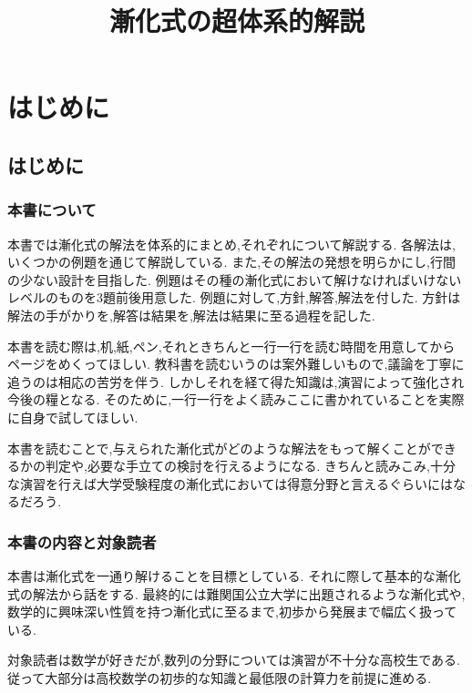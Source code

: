 \documentclass[dvipdfmx,a4paper,11pt,fleqn,openany]{jsbook}
\title{漸化式の超体系的解説}
\begin{document}
\date{}
\author{}
\maketitle

\tableofcontents

\chapter{はじめに}
  \section{はじめに}
    \subsection{本書について}
      本書では漸化式の解法を体系的にまとめ,それぞれについて解説する.
      各解法は,いくつかの例題を通じて解説している.
      また,その解法の発想を明らかにし,行間の少ない設計を目指した.
      例題はその種の漸化式において解けなければいけないレベルのものを3題前後用意した.
      例題に対して,方針,解答,解法を付した.
      方針は解法の手がかりを,解答は結果を,解法は結果に至る過程を記した.

      本書を読む際は,机,紙,ペン,それときちんと一行一行を読む時間を用意してからページをめくってほしい.
      教科書を読むいうのは案外難しいもので,議論を丁寧に追うのは相応の苦労を伴う.
      しかしそれを経て得た知識は,演習によって強化され今後の糧となる.
      そのために,一行一行をよく読みここに書かれていることを実際に自身で試してほしい.

      本書を読むことで,与えられた漸化式がどのような解法をもって解くことができるかの判定や,必要な手立ての検討を行えるようになる.
      きちんと読みこみ,十分な演習を行えば大学受験程度の漸化式においては得意分野と言えるぐらいにはなるだろう.     

    \subsection{本書の内容と対象読者}
      本書は漸化式を一通り解けることを目標としている.
      それに際して基本的な漸化式の解法から話をする.
      最終的には難関国公立大学に出題されるような漸化式や,数学的に興味深い性質を持つ漸化式に至るまで,初歩から発展まで幅広く扱っている.
      
      対象読者は数学が好きだが,数列の分野については演習が不十分な高校生である.
      従って大部分は高校数学の初歩的な知識と最低限の計算力を前提に進める.
\end{document}
